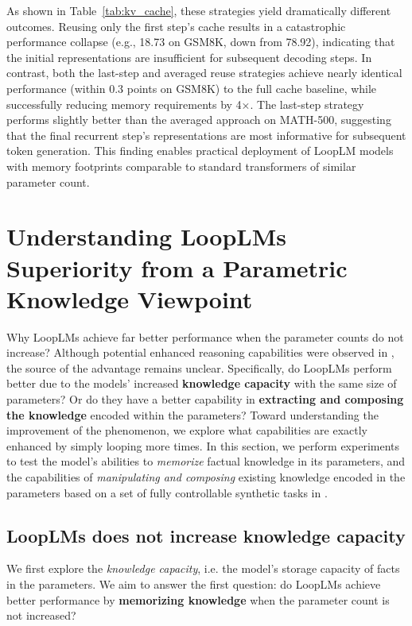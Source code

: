 \documentclass[]{bytedance_seed}
\newcommand{\1}{\mathbf{1}}
\newcommand{\ut}{LoopLM}
\begin{document}
As shown in Table~\ref{tab:kv_cache}, these strategies yield dramatically different outcomes. Reusing only the first step's cache results in a catastrophic performance collapse (e.g., 18.73 on GSM8K, down from 78.92), indicating that the initial representations are insufficient for subsequent decoding steps. In contrast, both the last-step and averaged reuse strategies achieve nearly identical performance (within 0.3 points on GSM8K) to the full cache baseline, while successfully reducing memory requirements by 4×. The last-step strategy performs slightly better than the averaged approach on MATH-500, suggesting that the final recurrent step's representations are most informative for subsequent token generation. This finding enables practical deployment of \ut{} models with memory footprints comparable to standard transformers of similar parameter count.

\section{Understanding \ut{}s Superiority from a Parametric Knowledge Viewpoint}
\label{sec:understanding_ut}
Why \ut{}s achieve far better performance when the parameter counts do not increase? Although potential enhanced reasoning capabilities were observed in \cite{saunshi2025reasoning}, the source of the advantage remains unclear. Specifically, do \ut{}s perform better due to the models' increased \textbf{knowledge capacity} with the same size of parameters? Or do they have a better capability in \textbf{extracting and composing the knowledge} encoded within the parameters? Toward understanding the improvement of the phenomenon, we explore what capabilities are exactly enhanced by simply looping more times. 
In this section, we perform experiments to test the model's abilities to \textit{memorize} factual knowledge in its parameters, and the capabilities of \textit{manipulating and composing} existing knowledge encoded in the parameters based on a set of fully controllable synthetic tasks in \cite{AL2024-knowledge3,Allenzhu2025-canon,yao2025language}.


\subsection{\ut{}s does not increase knowledge capacity}
\label{subsec:capacity}

We first explore the \textit{knowledge capacity}, i.e. the model's storage capacity of facts in the parameters. We aim to answer the first question: do \ut{}s achieve better performance by \textbf{memorizing knowledge} when the parameter count is not increased?
\end{document}
